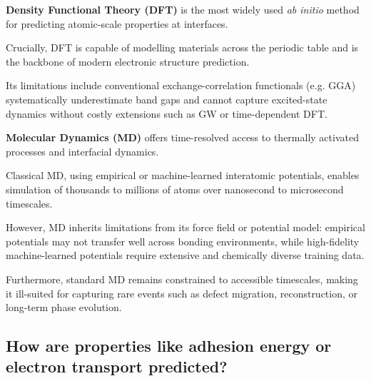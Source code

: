 
\textbf{Density Functional Theory (DFT)} is the most widely used \textit{ab initio} method for predicting atomic-scale
properties at interfaces\cite{Cervantes2025-ze}.

Crucially, DFT is capable of modelling materials across the periodic table and is the backbone of modern electronic
structure prediction.

Its limitations include conventional exchange-correlation functionals (e.g. GGA) systematically underestimate band gaps
and cannot capture excited-state dynamics without costly extensions such as GW or time-dependent DFT\cite{Butler2019-ws, Khot2025-hh}.


\textbf{Molecular Dynamics (MD)} offers time-resolved access to thermally activated processes and interfacial dynamics.

Classical MD, using empirical or machine-learned interatomic potentials, enables simulation of thousands to millions of
atoms over nanosecond to microsecond timescales\cite{Khot2025-hh, Batzner2022-fd, Schutt2018-xc}.

However, MD inherits limitations from its force field or potential model: empirical potentials may not transfer well
across bonding environments, while high-fidelity machine-learned potentials require extensive and chemically diverse
training data.

Furthermore, standard MD remains constrained to accessible timescales, making it ill-suited for capturing rare events
such as defect migration, reconstruction, or long-term phase evolution\cite{Khot2025-hh}.


\subsection{How are properties like adhesion energy or electron transport predicted?}









